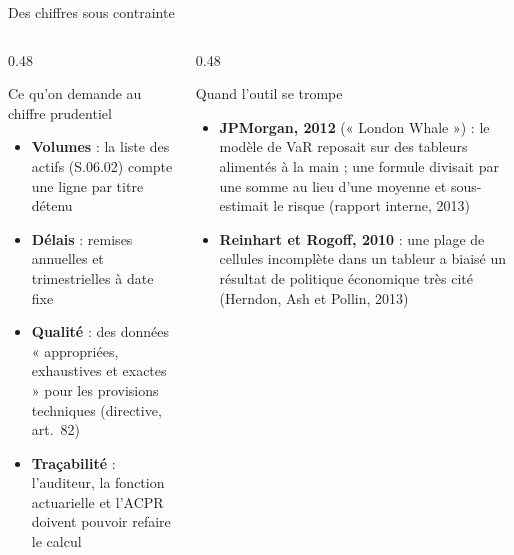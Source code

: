 \documentclass[10pt,aspectratio=169]{beamer}
\begin{document}
\begin{frame}{Des chiffres sous contrainte}
\begin{columns}[T]
\begin{column}{0.48\textwidth}
\begin{block}{Ce qu'on demande au chiffre prudentiel}
\begin{itemize}
  \item \textbf{Volumes} : la liste des actifs (S.06.02) compte une ligne par titre détenu
  \item \textbf{Délais} : remises annuelles et trimestrielles à date fixe
  \item \textbf{Qualité} : des données « appropriées, exhaustives et exactes » pour les provisions techniques (directive, art.~82)
  \item \textbf{Traçabilité} : l'auditeur, la fonction actuarielle et l'ACPR doivent pouvoir refaire le calcul
\end{itemize}
\end{block}
\end{column}
\begin{column}{0.48\textwidth}
\begin{alertblock}{Quand l'outil se trompe}
\small
\begin{itemize}
  \item \textbf{JPMorgan, 2012} (« London Whale ») : le modèle de VaR reposait sur des tableurs
        alimentés à la main ; une formule divisait par une somme au lieu d'une moyenne et
        sous-estimait le risque (rapport interne, 2013)
  \item \textbf{Reinhart et Rogoff, 2010} : une plage de cellules incomplète dans un tableur a
        biaisé un résultat de politique économique très cité (Herndon, Ash et Pollin, 2013)
\end{itemize}
\end{alertblock}
\end{column}
\end{columns}
\end{frame}
\end{document}
